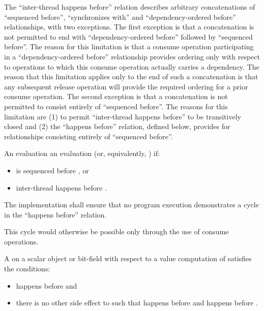 \begin{note} The ``inter-thread happens before'' relation describes arbitrary
concatenations of ``sequenced before'', ``synchronizes with'' and
``dependency-ordered before'' relationships, with two exceptions. The first
exception is that a concatenation is not permitted to end with
``dependency-ordered before'' followed by ``sequenced before''. The reason for
this limitation is that a consume operation participating in a
``dependency-ordered before'' relationship provides ordering only with respect
to operations to which this consume operation actually carries a dependency. The
reason that this limitation applies only to the end of such a concatenation is
that any subsequent release operation will provide the required ordering for a
prior consume operation. The second exception is that a concatenation is not
permitted to consist entirely of ``sequenced before''. The reasons for this
limitation are (1) to permit ``inter-thread happens before'' to be transitively
closed and (2) the ``happens before'' relation, defined below, provides for
relationships consisting entirely of ``sequenced before''. \end{note}

\pnum
An evaluation   an evaluation 
(or, equivalently,   ) if:

\begin{itemize}
\item {} is sequenced before , or
\item {} inter-thread happens before .
\end{itemize}

The implementation shall ensure that no program execution demonstrates a cycle
in the ``happens before'' relation. \begin{note} This cycle would otherwise be
possible only through the use of consume operations. \end{note}

\pnum
A   on a scalar object or bit-field 
with respect to a value computation  of  satisfies the
conditions:

\begin{itemize}
\item {} happens before  and
\item there is no other
%
side effect  to  such that 
happens before  and  happens before .
\end{itemize}

